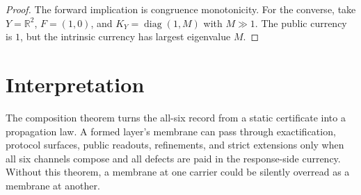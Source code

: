 \documentclass[11pt]{article}
\begin{document}
\begin{proof}
The forward implication is congruence monotonicity. For the converse, take $Y=\mathbb R^2$, $F=(1,0)$, and $K_Y=\operatorname{diag}(1,M)$ with $M\gg1$. The public currency is $1$, but the intrinsic currency has largest eigenvalue $M$.
\end{proof}

\section{Interpretation}

The composition theorem turns the all-six record from a static certificate into a propagation law. A formed layer's membrane can pass through exactification, protocol surfaces, public readouts, refinements, and strict extensions only when all six channels compose and all defects are paid in the response-side currency. Without this theorem, a membrane at one carrier could be silently overread as a membrane at another.
\end{document}
